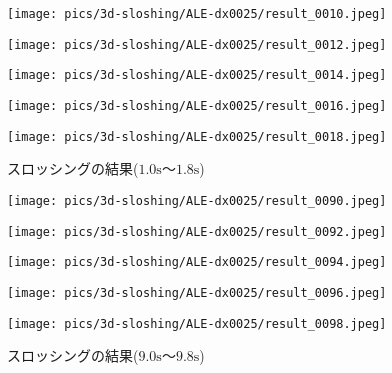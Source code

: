 \begin{figure}[H]
	\centering
	\begin{minipage}[b]{0.19\columnwidth}
	    \centering
	    \texttt{[image: pics/3d-sloshing/ALE-dx0025/result\_0010.jpeg]}
	\end{minipage}
	\begin{minipage}[b]{0.19\columnwidth}
	    \centering
	    \texttt{[image: pics/3d-sloshing/ALE-dx0025/result\_0012.jpeg]}
	\end{minipage}
	\begin{minipage}[b]{0.19\columnwidth}
	    \centering
	    \texttt{[image: pics/3d-sloshing/ALE-dx0025/result\_0014.jpeg]}
	\end{minipage}
	\begin{minipage}[b]{0.19\columnwidth}
	    \centering
	    \texttt{[image: pics/3d-sloshing/ALE-dx0025/result\_0016.jpeg]}
	\end{minipage}
	\begin{minipage}[b]{0.19\columnwidth}
	    \centering
	    \texttt{[image: pics/3d-sloshing/ALE-dx0025/result\_0018.jpeg]}
	\end{minipage}
	\caption{スロッシングの結果($1.0\mathrm{s}$～$1.8\mathrm{s}$)}
	\label{fig:sloshing-result}
\end{figure}
\begin{figure}[H]
	\centering
	\begin{minipage}[b]{0.19\columnwidth}
	    \centering
	    \texttt{[image: pics/3d-sloshing/ALE-dx0025/result\_0090.jpeg]}
	\end{minipage}
	\begin{minipage}[b]{0.19\columnwidth}
	    \centering
	    \texttt{[image: pics/3d-sloshing/ALE-dx0025/result\_0092.jpeg]}
	\end{minipage}
	\begin{minipage}[b]{0.19\columnwidth}
	    \centering
	    \texttt{[image: pics/3d-sloshing/ALE-dx0025/result\_0094.jpeg]}
	\end{minipage}
	\begin{minipage}[b]{0.19\columnwidth}
	    \centering
	    \texttt{[image: pics/3d-sloshing/ALE-dx0025/result\_0096.jpeg]}
	\end{minipage}
	\begin{minipage}[b]{0.19\columnwidth}
	    \centering
	    \texttt{[image: pics/3d-sloshing/ALE-dx0025/result\_0098.jpeg]}
	\end{minipage}
	\caption{スロッシングの結果($9.0\mathrm{s}$～$9.8\mathrm{s}$)}
	\label{fig:sloshing-result}
\end{figure}

